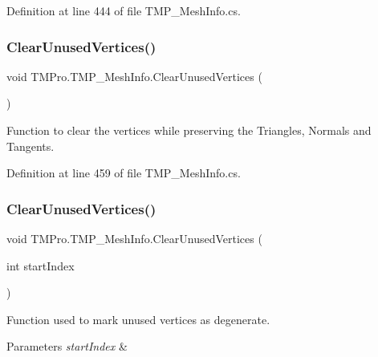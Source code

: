 Definition at line 444 of file T\+M\+P\+\_\+\+Mesh\+Info.\+cs.

\mbox{\label{struct_t_m_pro_1_1_t_m_p___mesh_info_a7abd732cdaf4d54113166700701defd4}} 
\subsubsection{\texorpdfstring{ClearUnusedVertices()}{ClearUnusedVertices()}\hspace{0.1cm}{\footnotesize\ttfamily [1/3]}}
{\footnotesize\ttfamily void T\+M\+Pro.\+T\+M\+P\+\_\+\+Mesh\+Info.\+Clear\+Unused\+Vertices (\begin{DoxyParamCaption}{ }\end{DoxyParamCaption})}



Function to clear the vertices while preserving the Triangles, Normals and Tangents. 



Definition at line 459 of file T\+M\+P\+\_\+\+Mesh\+Info.\+cs.

\mbox{\label{struct_t_m_pro_1_1_t_m_p___mesh_info_ad2667025b52d22291cc6c57fd5a95126}} 
\subsubsection{\texorpdfstring{ClearUnusedVertices()}{ClearUnusedVertices()}\hspace{0.1cm}{\footnotesize\ttfamily [2/3]}}
{\footnotesize\ttfamily void T\+M\+Pro.\+T\+M\+P\+\_\+\+Mesh\+Info.\+Clear\+Unused\+Vertices (\begin{DoxyParamCaption}\item[{int}]{start\+Index }\end{DoxyParamCaption})}



Function used to mark unused vertices as degenerate. 


\begin{DoxyParams}{Parameters}
{\em start\+Index} & \\
\hline
\end{DoxyParams}


